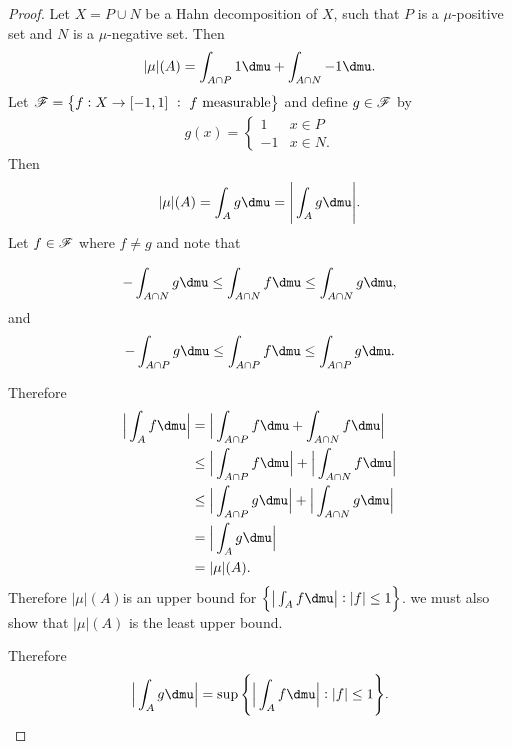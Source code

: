 \begin{proof}
  Let $X = P \cup N$ be a Hahn decomposition of $X$, such that $P$ is a $\mu$-positive set and $N$ is
  a $\mu$-negative set. Then
  \begin{align*}
    |\mu|(A) =\int_{A\cap P} 1 \dmu + \int_{A \cap N} -1 \dmu.
  \end{align*}
  Let $\mathscr F = \big\{f: X \to [-1, 1] ~: ~ f \text{~measurable} \big\}$ and define $g \in \mathscr F$ by
  \begin{align*}
    g(x) =
    \begin{cases}
      1  & x \in P \\
      -1 & x \in N.
    \end{cases}
  \end{align*}
  Then
  \begin{align*}
    |\mu|(A) = \int_A g \dmu = \Bigg|\int_A g \dmu\Bigg|.
  \end{align*}
  Let $f \in \mathscr F$ where $f \neq g$ and note that

  \begin{align*}
    -\int_{A \cap N} g \dmu \leq \int_{A \cap N} f \dmu \leq \int_{A \cap N} g \dmu,
  \end{align*}
  and
  \begin{align*}
    -\int_{A \cap P} g \dmu \leq \int_{A \cap P} f \dmu \leq \int_{A \cap P} g \dmu.
  \end{align*}

  Therefore
  \begin{align*}
    \Big|\int_A f \dmu\Big|
    &= \Big|\int_{A \cap P} f \dmu + \int_{A \cap N} f \dmu\Big| \\
    &\leq \Big|\int_{A \cap P} f \dmu\Big| + \Big|\int_{A \cap N} f \dmu\Big| \\
    &\leq \Big|\int_{A \cap P} g \dmu\Big| + \Big|\int_{A \cap N} g \dmu\Big| \\
    &= \Big|\int_{A} g \dmu\Big| \\
    &= |\mu|(A).
  \end{align*}
  Therefore $|\mu|(A)$is an upper bound for $\Big\{ \big|\int_A f \dmu\big| : |f| \leq 1 \Big\}$.
   we must also show that $|\mu|(A)$ is the least upper bound.

  Therefore
  \begin{align*}
    \Big|\int_{A} g \dmu\Big| = \sup\Bigg\{ \Big|\int_A f \dmu\Big| : |f| \leq 1 \Bigg\}.
  \end{align*}
\end{proof}


